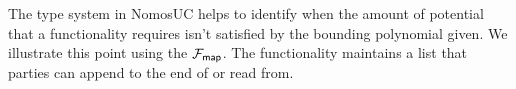%
%
%
%
%
%
%
%
%
%
%
%
%


The type system in NomosUC helps to identify when the amount of potential that a functionality requires isn't satisfied by the bounding polynomial given.
We illustrate this point using the $\mathcal{F}_{{\mathsf {map}}}$. 
The functionality maintains a list that parties can append to the end of or read from.

